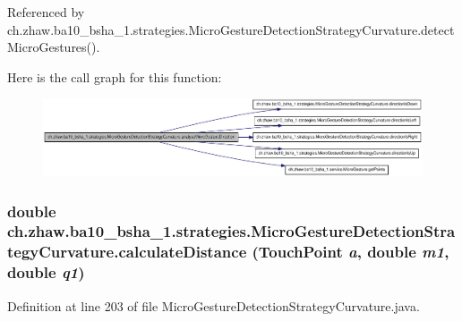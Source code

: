 Referenced by ch.zhaw.ba10\_\-bsha\_\-1.strategies.MicroGestureDetectionStrategyCurvature.detectMicroGestures().

Here is the call graph for this function:\nopagebreak
\begin{figure}[H]
\begin{center}
\leavevmode
\includegraphics[width=420pt]{classch_1_1zhaw_1_1ba10__bsha__1_1_1strategies_1_1MicroGestureDetectionStrategyCurvature_a8290d90ed16b0c2e0a14ab7de9cb1493_cgraph}
\end{center}
\end{figure}
\hypertarget{classch_1_1zhaw_1_1ba10__bsha__1_1_1strategies_1_1MicroGestureDetectionStrategyCurvature_aa729634754fd1d0e1d5c4f0c5b403500}{
\subsubsection[{calculateDistance}]{\setlength{\rightskip}{0pt plus 5cm}double ch.zhaw.ba10\_\-bsha\_\-1.strategies.MicroGestureDetectionStrategyCurvature.calculateDistance ({\bf TouchPoint} {\em a}, \/  double {\em m1}, \/  double {\em q1})}}
\label{classch_1_1zhaw_1_1ba10__bsha__1_1_1strategies_1_1MicroGestureDetectionStrategyCurvature_aa729634754fd1d0e1d5c4f0c5b403500}


Definition at line 203 of file MicroGestureDetectionStrategyCurvature.java.

